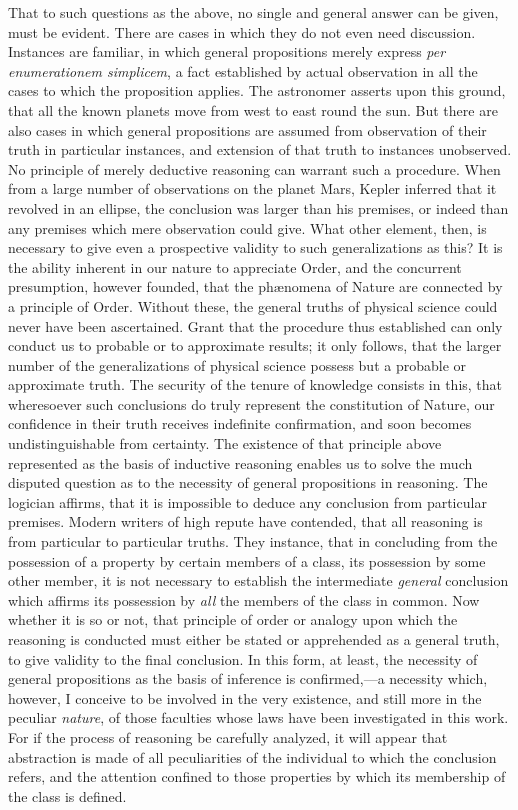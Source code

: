 \documentclass[oneside]{book}
\begin{document}
That to such questions as the above, no single and general
answer can be given, must be evident. There are cases in which
they do not even need discussion. Instances are familiar, in
which general propositions merely express \textit{per enumerationem
simplicem}, a fact established by actual observation in all the
cases to which the proposition applies. The astronomer asserts upon this ground, that all the known planets move from
west to east round the sun. But there are also cases in which
general propositions are assumed from observation of their truth
in particular instances, and extension of that truth to instances
unobserved. No principle of merely deductive reasoning can
warrant such a procedure. When from a large number of observations on the planet Mars, Kepler inferred that it revolved
in an ellipse, the conclusion was larger than his premises, or indeed than any premises which mere observation could give.
What other element, then, is necessary to give even a prospective
validity to such generalizations as this? It is the ability inherent in our nature to appreciate Order, and the concurrent presumption, however founded, that the ph{\ae}nomena of Nature are
connected by a principle of Order. Without these, the general
truths of physical science could never have been ascertained.
Grant that the procedure thus established can only conduct us
to probable or to approximate results; it only follows, that the
larger number of the generalizations of physical science possess
but a probable or approximate truth. The security of the tenure
of knowledge consists in this, that wheresoever such conclusions
do truly represent the constitution of Nature, our confidence in
their truth receives indefinite confirmation, and soon becomes
undistinguishable from certainty. The existence of that principle above represented as the basis of inductive reasoning
enables us to solve the much disputed question as to the necessity of general propositions in reasoning. The logician affirms,
that it is impossible to deduce any conclusion from particular
premises. Modern writers of high repute have contended, that
all reasoning is from particular to particular truths. They instance, that in concluding from the possession of a property by
certain members of a class, its possession by some other member,
it is not necessary to establish the intermediate \emph{general}
conclusion which affirms its possession by \emph{all} the members of the class
in common. Now whether it is so or not, that principle of
order or analogy upon which the reasoning is conducted must
either be stated or apprehended as a general truth, to give validity to the final conclusion. In this form, at least, the necessity
of general propositions as the basis of inference is confirmed,---a
necessity which, however, I conceive to be involved in the very
existence, and still more in the peculiar \emph{nature}, of those faculties
whose laws have been investigated in this work. For if the process of reasoning be carefully analyzed, it will appear that abstraction is made of all peculiarities of the individual to which
the conclusion refers, and the attention confined to those properties by which its membership of the class is defined.
\end{document}
